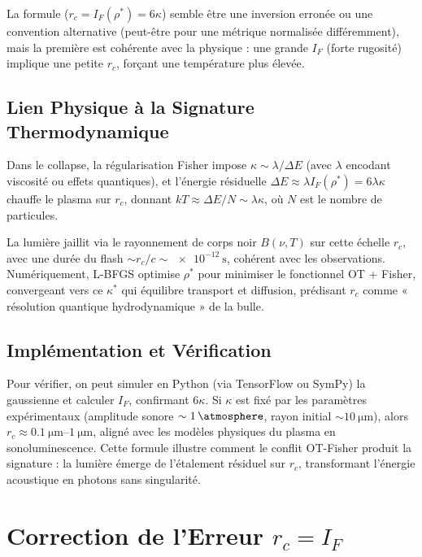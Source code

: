 \documentclass[a4paper,12pt]{article}
\begin{document}
La formule (\( r_c = I_F(\rho^*) = 6 \kappa \))
semble être une inversion erronée ou une convention alternative
(peut-être pour une métrique normalisée différemment),
mais la première est cohérente avec la physique :
une grande \( I_F \) (forte rugosité) implique une petite \( r_c \), forçant une température plus élevée.

\subsection{Lien Physique à la Signature Thermodynamique}
Dans le collapse, la régularisation Fisher impose
\( \kappa \sim \lambda / \Delta E \)
(avec \( \lambda \) encodant viscosité ou effets quantiques),
et l'énergie résiduelle
\( \Delta E \approx \lambda I_F(\rho^*) = 6 \lambda \kappa \)
chauffe le plasma sur \( r_c \),
donnant
\( k T \approx \Delta E / N \sim \lambda \kappa \),
où \( N \) est le nombre de particules.

La lumière jaillit via le rayonnement de corps noir \( B(\nu, T) \) sur cette échelle \( r_c \),
avec une durée du flash \(\sim r_c / c \sim \SI{e-12}{\second}\),
cohérent avec les observations.
Numériquement, L-BFGS optimise \( \rho^* \) pour minimiser le fonctionnel OT + Fisher,
convergeant vers ce \( \kappa^* \) qui équilibre transport et diffusion,
prédisant \( r_c \) comme « résolution quantique hydrodynamique » de la bulle.

\subsection{Implémentation et Vérification}
Pour vérifier, on peut simuler en Python (via TensorFlow ou SymPy) la gaussienne et calculer \( I_F \),
confirmant \( 6 \kappa \).
Si \( \kappa \) est fixé par les paramètres expérimentaux (amplitude sonore \(\sim \SI{1}{\atmosphere}\), rayon initial \(\sim \SI{10}{\micro\meter}\)),
alors \( r_c \approx \SIrange{0.1}{1}{\micro\meter} \),
aligné avec les modèles physiques du plasma en sonoluminescence.
Cette formule illustre comment le conflit OT-Fisher produit la signature :
la lumière émerge de l'étalement résiduel sur \( r_c \),
transformant l'énergie acoustique en photons sans singularité.
\newpage
\section{Correction de l'Erreur \( r_c = I_F \)}
\end{document}
